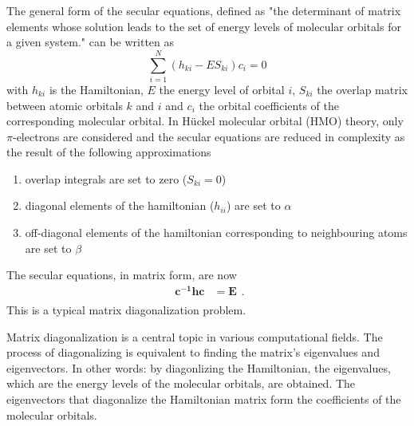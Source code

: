 \documentclass{article}
\begin{document}
The general form of the secular equations, defined as "the determinant of matrix elements whose solution leads to the set of energy levels of molecular orbitals for a given system."\cite{Minkin2009} can be written as
%
\begin{equation}
\sum_{i=1}^N(h_{ki} - {E}S_{ki})c_i = 0
\end{equation}
%
with $h_{ki}$ is the Hamiltonian, $E$ the energy level of orbital $i$, $S_{ki}$ the overlap matrix between atomic orbitals $k$ and $i$ and $c_i$ the orbital coefficients of the corresponding molecular orbital.
%
%
In H\"uckel molecular orbital (HMO) theory, only $\pi$-electrons are considered and the secular equations are reduced in complexity as the result of the following approximations
%
\begin{enumerate}
\item overlap integrals are set to zero ($S_{ki} = 0$)
\item diagonal elements of the hamiltonian ($h_{ii}$) are set to $\alpha$
\item off-diagonal elements of the hamiltonian corresponding to neighbouring atoms are set to $\beta$
\end{enumerate}
%
The secular equations, in matrix form, are now
%
\begin{equation}
\begin{split}
\boldsymbol{c^{-1}hc} &= \boldsymbol{E} \\
\end{split}.
\label{eq:diagonalization}
\end{equation}
%
This is a typical matrix diagonalization problem.

Matrix diagonalization is a central topic in various computational fields. The process of diagonalizing is equivalent to finding the matrix's eigenvalues and eigenvectors. In other words: by diagonlizing the Hamiltonian, the eigenvalues, which are the energy levels of the molecular orbitals, are obtained. The eigenvectors that diagonalize the Hamiltonian matrix form the coefficients of the molecular orbitals.
\end{document}
